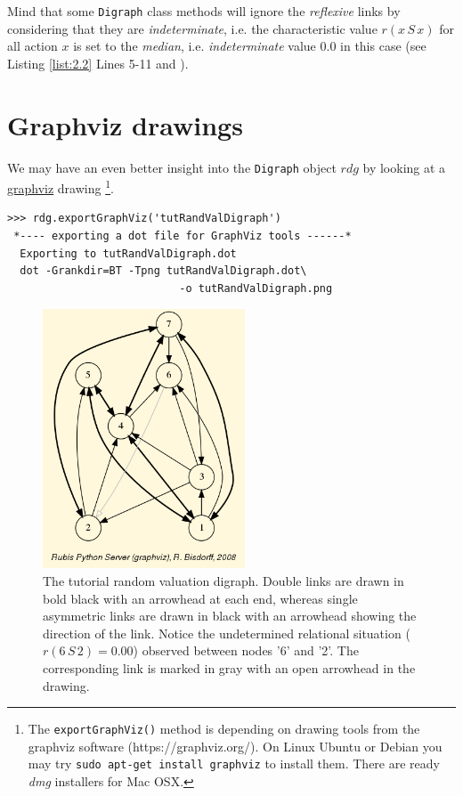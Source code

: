 Mind that some \texttt{Digraph} class methods will ignore the \emph{reflexive} links by considering that they are \emph{indeterminate}, i.e. the characteristic value $r(x\,S\,x)$ for all action $x$ is set to the \emph{median}, i.e. \emph{indeterminate} value $0.0$ in this case (see Listing \ref{list:2.2} Lines 5-11 and \citet{BIS-2004a}).

\section{Graphviz drawings}
\label{sec:2.2}

We may have an even better insight into the \texttt{Digraph} object $rdg$ by looking at a \href{https://graphviz.org/}{graphviz} drawing \footnote{The \texttt{exportGraphViz()} method is depending on drawing tools from the graphviz software (https://graphviz.org/). On Linux Ubuntu or Debian you may try \texttt{sudo apt-get install graphviz} to install them. There are ready \emph{dmg} installers for Mac OSX.}.
\begin{lstlisting}
>>> rdg.exportGraphViz('tutRandValDigraph')
 *---- exporting a dot file for GraphViz tools ------*
  Exporting to tutRandValDigraph.dot
  dot -Grankdir=BT -Tpng tutRandValDigraph.dot\
                           -o tutRandValDigraph.png
\end{lstlisting}
\begin{figure}[h]
\sidecaption[t]
\includegraphics[width=6cm]{Figures/tutRandValDigraph.png}
\caption{The tutorial random valuation digraph. Double links are drawn in bold black with an arrowhead at each end, whereas single asymmetric links are drawn in black with an arrowhead showing the direction of the link. Notice the undetermined relational situation ($r(6\,S\,2) = 0.00$) observed between nodes '6' and '2'. The corresponding link is marked in gray with an open arrowhead in the drawing.}
\label{fig:2.1}       %
\end{figure}
  
